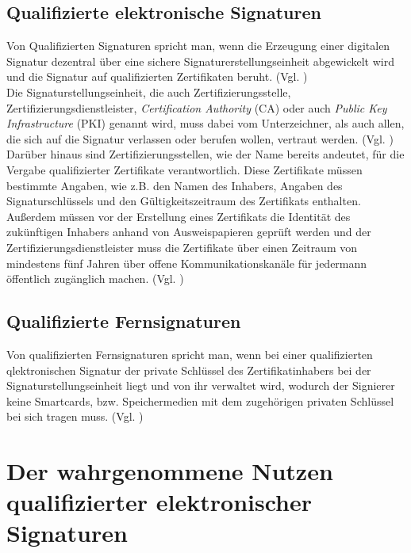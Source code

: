 \documentclass[deutsch]{lib/llncs/llncs}
\begin{document}
\subsection{Qualifizierte elektronische Signaturen}
Von Qualifizierten Signaturen spricht man, wenn die Erzeugung einer digitalen Signatur dezentral über eine sichere Signaturerstellungseinheit abgewickelt wird und die Signatur auf qualifizierten Zertifikaten beruht. (Vgl. \cite[S. 8]{gruhn2007elektronische}) \\
Die Signaturstellungseinheit, die auch Zertifizierungsstelle, Zertifizierungsdienstleister, \textit{Certification Authority} (CA) oder auch \textit{Public Key Infrastructure} (PKI) genannt wird, muss dabei vom Unterzeichner, als auch allen, die sich auf die Signatur verlassen oder berufen wollen, vertraut werden. (Vgl. \cite[S. 9]{gruhn2007elektronische}) \\
Darüber hinaus sind Zertifizierungsstellen, wie der Name bereits andeutet, für die Vergabe qualifizierter Zertifikate verantwortlich. 
Diese Zertifikate müssen bestimmte Angaben, wie z.B. den Namen des Inhabers, Angaben des Signaturschlüssels und den Gültigkeitszeitraum des Zertifikats enthalten. Außerdem müssen vor der Erstellung eines Zertifikats die Identität des zukünftigen Inhabers anhand von Ausweispapieren geprüft werden und der Zertifizierungsdienstleister muss die Zertifikate über einen Zeitraum von mindestens fünf Jahren über offene Kommunikationskanäle für jedermann öffentlich zugänglich machen. (Vgl. \cite[S. 9]{gruhn2007elektronische}) 


\subsection{Qualifizierte Fernsignaturen}
Von qualifizierten Fernsignaturen spricht man, wenn bei einer qualifizierten qlektronischen Signatur der private Schlüssel des Zertifikatinhabers bei der Signaturstellungseinheit liegt und von ihr verwaltet wird, wodurch der Signierer keine Smartcards, bzw. Speichermedien mit dem zugehörigen privaten Schlüssel bei sich tragen muss. (Vgl. \cite[S. 30]{schmeh2017neue})


\section{Der wahrgenommene Nutzen qualifizierter elektronischer Signaturen}
\end{document}
